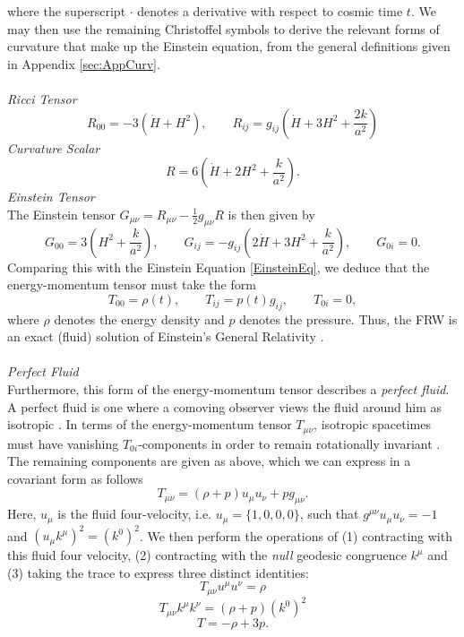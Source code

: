   where the superscript $\cdot$ denotes a derivative with respect to cosmic time $t$. We may then use the remaining Christoffel symbols to derive the relevant forms of curvature that make up the Einstein equation, from the general definitions given in Appendix \ref{sec:AppCurv}.
  \\\\ \emph{Ricci Tensor}\\
  \[
  R_{00}=-3\left(\dot{H}+H^2\right),\qquad R_{ij}=g_{ij}\left(\dot{H}+3H^2+\frac{2k}{a^2}\right)
  \]
\emph{Curvature Scalar}\\
\[
\label{FLRWscalar}
R=6\left(\dot{H}+2H^2+\frac{k}{a^2}\right)
.\]
\emph{Einstein Tensor}\\
The Einstein tensor $G_{\mu\nu}=R_{\mu\nu}-\frac{1}{2}g_{\mu\nu}R$ is then given by
\[
G_{00}=3\left(H^2+\frac{k}{a^2}\right),\qquad G_{ij}=-g_{ij}\left(2\dot{H}+3H^2+\frac{k}{a^2}\right),\qquad G_{0i}=0
.\] 
Comparing this with the Einstein Equation \eqref{EinsteinEq}, we deduce that the energy-momentum tensor must take the form
\[
T_{00}=\rho(t),\qquad T_{ij}=p(t)g_{ij},\qquad T_{0i}=0
,\]
where $\rho$ denotes the energy density and $p$ denotes the pressure. Thus, the FRW is an exact (fluid) solution of Einstein's General Relativity   \cite{Carroll:2004st, Clifton:2011jh, Wald:GR, Blau}.
\\\\ \emph{Perfect Fluid}\\
Furthermore, this form of the energy-momentum tensor describes a \emph{perfect fluid}. A perfect fluid is one where a comoving observer views the fluid around him as isotropic \cite{Weinberg:100595}. 
 In terms of the energy-momentum tensor $T_{\mu\nu}$, isotropic spacetimes must have vanishing $T_{0i}$-components in order to remain rotationally invariant \cite{Carroll:2004st}. The remaining components are given as above, which we can express in a covariant form as follows
\[
T_{\mu\nu}=(\rho+p)u_\mu u_\nu +p g_{\mu\nu}
.\]
Here, $u_\mu$ is the fluid four-velocity, i.e. $u_{\mu}=\{1,0,0,0\}$, such that $g^{\mu\nu}u_\mu u_\nu=-1$ and $(u_\mu k^\mu)^2=(k^0)^2$. We then perform the operations of (1) contracting with this fluid four velocity, (2) contracting with the \emph{null} geodesic congruence $k^\mu$ and (3) taking the trace to express three distinct identities:
\[
\label{Tu}
T_{\mu\nu}u^\mu u^\nu=\rho 
\]
\[
\label{Tk}
T_{\mu\nu}k^\mu k^\nu=(\rho+p)(k^0)^2
\]
\[
\label{Ttrace}
T=-\rho+3p
.\]
